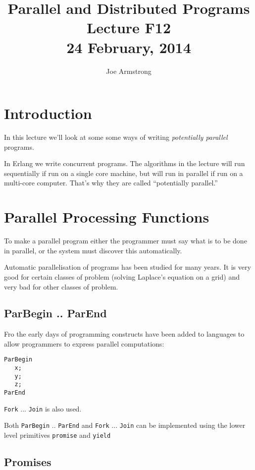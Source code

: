 \documentclass[10pt]{article}
\title{Parallel and Distributed Programs\\
Lecture F12\\
24 February, 2014
}
\author{Joe Armstrong}
\begin{document}
\maketitle

\tableofcontents

\section{Introduction}
In this lecture we'll look at some some ways of writing {\sl
  potentially parallel} programs.

In Erlang we write concurrent programs. The algorithms in the lecture
will run sequentially if run on a single core machine, but will run
in parallel if run on a multi-core computer. That's why they are
called ``potentially parallel.''


\section{Parallel Processing Functions}

To make a parallel program either the programmer must say what is to be
done in parallel, or the system must discover this automatically.

Automatic parallelisation of programs has been studied for many years.
It is very good for certain classes of problem (solving Laplace's
equation on a grid) and very bad for other classes of problem.

\subsection{ParBegin .. ParEnd}

Fro the early days of programming constructs have been added to
languages to allow programmers to express parallel computations:

\begin{verbatim}
ParBegin
   x;
   y;
   z;
ParEnd
\end{verbatim}

\verb+Fork+ ... \verb+Join+ is also used.

Both \verb+ParBegin+ .. \verb+ParEnd+ and \verb+Fork+ ... \verb+Join+ can be 
implemented using the lower level primitives \verb+promise+ and \verb+yield+

\subsection{Promises}
\end{document}
